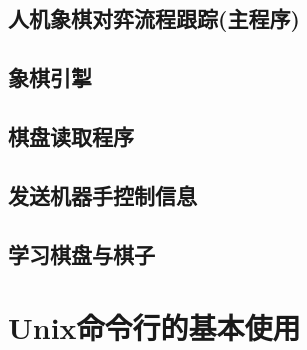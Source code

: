 \documentclass[a4paper]{article}
\begin{document}
\subsection{人机象棋对弈流程跟踪(主程序)}
\subsection{象棋引掣}
\subsection{棋盘读取程序}
\subsection{发送机器手控制信息}
\subsection{学习棋盘与棋子}

\clearpage
\appendix
\section{Unix命令行的基本使用}
\label{app1}
\end{document}
